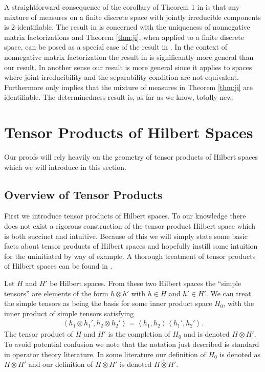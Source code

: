 \documentclass[aos,preprint]{imsart}
\def\l{\left}
\def\r{\right}
\theoremstyle{plain}
\theoremstyle{defintion}
\begin{document}
	A straightforward consequence of the corollary of Theorem 1 in \cite{donoho03} is that any mixture of measures on a finite discrete space with jointly irreducible components is $2$-identifiable. The result in \cite{donoho03} is concerned with the uniqueness of nonnegative matrix factorizations and Theorem \ref{thm:ji}, when applied to a finite discrete space, can be posed as a special case of the result in \cite{donoho03}. In the context of nonnegative matrix factorization the result in \cite{donoho03} is significantly more general than our result. In another sense our result is more general since it applies to spaces where joint irreducibility and the separability condition are not equivalent. Furthermore \cite{donoho03} only implies that the mixture of measures in Theorem \ref{thm:ji} are identifiable. The determinedness result is, as far as we know, totally new.

	\section{Tensor Products of Hilbert Spaces}
	Our proofs will rely heavily on the geometry of tensor products of Hilbert spaces which we will introduce in this section.

	\subsection{Overview of Tensor Products}
	First we introduce tensor products of Hilbert spaces. To our knowledge there does not exist a rigorous construction of the tensor product Hilbert space which is both succinct and intuitive. Because of this we will simply state some basic facts about tensor products of Hilbert spaces and hopefully instill some intuition for the uninitiated by way of example. A thorough treatment of tensor products of Hilbert spaces can be found in \cite{kadison83}.

	Let $H$ and $H'$ be Hilbert spaces. From these two Hilbert spaces the ``simple tensors'' are elements of the form $h\otimes h'$ with $h\in H$ and $h' \in H'$. We can treat the simple tensors as being the basis for some inner product space $H_0$, with the inner product of simple tensors satisfying
	\begin{eqnarray*}
		\l<h_1 \otimes h_1', h_2 \otimes h_2'\r> = \l<h_1,h_2\r>\l<h_1',h_2'\r>.
	\end{eqnarray*}
	The tensor product of $H$ and $H'$ is the completion of $H_0$ and is denoted $H\otimes H'$. To avoid potential confusion we note that the notation just described is standard in operator theory literature. In some literature our definition of $H_0$ is denoted as $H\otimes H'$ and our definition of $H \otimes H'$ is denoted $H \widehat{\otimes} H'$.
\end{document}

